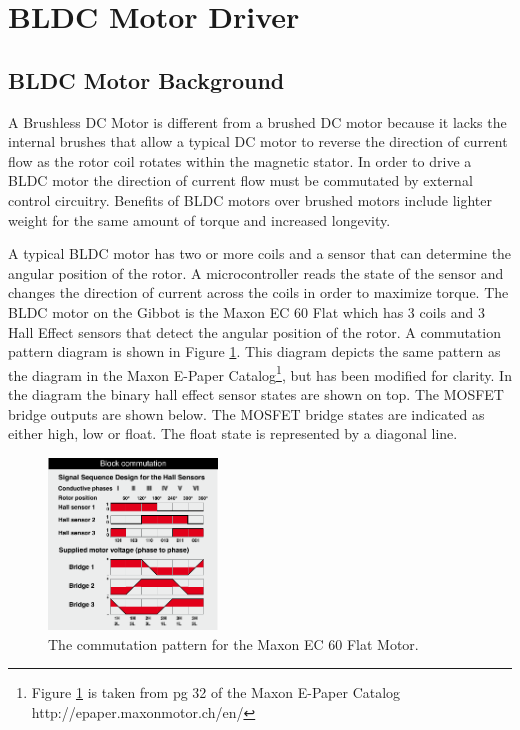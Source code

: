 \documentclass{article}
\begin{document}
\newpage
\section{BLDC Motor Driver}
\subsection{BLDC Motor Background}
A Brushless DC Motor is different from a brushed DC motor because it lacks the internal brushes that allow a typical DC motor to reverse the direction of current flow as the rotor coil rotates within the magnetic stator. In order to drive a BLDC motor the direction of current flow must be commutated by external control circuitry. Benefits of BLDC motors over brushed motors include lighter weight for the same amount of torque and increased longevity.

A typical BLDC motor has two or more coils and a sensor that can determine the angular position of the rotor. A microcontroller reads the state of the sensor and changes the direction of current across the coils in order to maximize torque. The BLDC motor on the Gibbot is the Maxon EC 60 Flat which has 3 coils and 3 Hall Effect sensors that detect the angular position of the rotor. A commutation pattern diagram is shown in Figure \ref{fig:commutation}. This diagram depicts the same pattern as the diagram in the Maxon E-Paper Catalog\footnote{\raggedright Figure \ref{fig:commutation} is taken from pg 32 of the Maxon E-Paper Catalog http://epaper.maxonmotor.ch/en/}, but has been modified for clarity. In the diagram the binary hall effect sensor states are shown on top. The MOSFET bridge outputs are shown below. The MOSFET bridge states are indicated as either high, low or float. The float state is represented by a diagonal line. 
\begin{figure}[h!]
	\centering
	\includegraphics[width=0.4\textwidth]{commutation2}
	\caption{The commutation pattern for the Maxon EC 60 Flat Motor.}
	\label{fig:commutation}
\end{figure}
\end{document}
